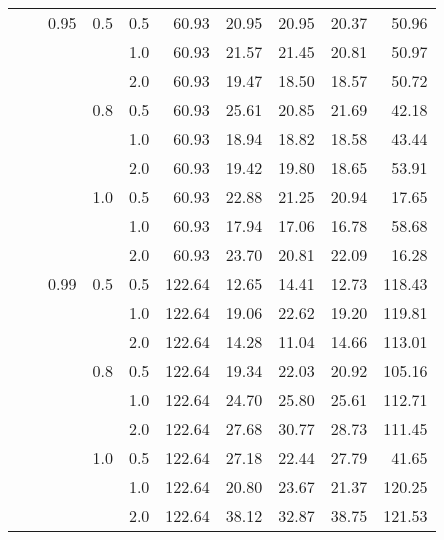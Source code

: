 \documentclass{article}
\begin{document}
{\begin{tabular}{lllllrrrrr}
            &     & 0.95 & 0.5 & 0.5 &   60.93 &   20.95 &             20.95 &                20.37 &      50.96 \\
            &     &      &     & 1.0 &   60.93 &   21.57 &             21.45 &                20.81 &      50.97 \\
            &     &      &     & 2.0 &   60.93 &   19.47 &             18.50 &                18.57 &      50.72 \\
            &     &      & 0.8 & 0.5 &   60.93 &   25.61 &             20.85 &                21.69 &      42.18 \\
            &     &      &     & 1.0 &   60.93 &   18.94 &             18.82 &                18.58 &      43.44 \\
            &     &      &     & 2.0 &   60.93 &   19.42 &             19.80 &                18.65 &      53.91 \\
            &     &      & 1.0 & 0.5 &   60.93 &   22.88 &             21.25 &                20.94 &      17.65 \\
            &     &      &     & 1.0 &   60.93 &   17.94 &             17.06 &                16.78 &      58.68 \\
            &     &      &     & 2.0 &   60.93 &   23.70 &             20.81 &                22.09 &      16.28 \\
            &     & 0.99 & 0.5 & 0.5 &  122.64 &   12.65 &             14.41 &                12.73 &     118.43 \\
            &     &      &     & 1.0 &  122.64 &   19.06 &             22.62 &                19.20 &     119.81 \\
            &     &      &     & 2.0 &  122.64 &   14.28 &             11.04 &                14.66 &     113.01 \\
            &     &      & 0.8 & 0.5 &  122.64 &   19.34 &             22.03 &                20.92 &     105.16 \\
            &     &      &     & 1.0 &  122.64 &   24.70 &             25.80 &                25.61 &     112.71 \\
            &     &      &     & 2.0 &  122.64 &   27.68 &             30.77 &                28.73 &     111.45 \\
            &     &      & 1.0 & 0.5 &  122.64 &   27.18 &             22.44 &                27.79 &      41.65 \\
            &     &      &     & 1.0 &  122.64 &   20.80 &             23.67 &                21.37 &     120.25 \\
            &     &      &     & 2.0 &  122.64 &   38.12 &             32.87 &                38.75 &     121.53 \\
          \bottomrule
          \end{tabular}
          
          
}  
\end{document}
